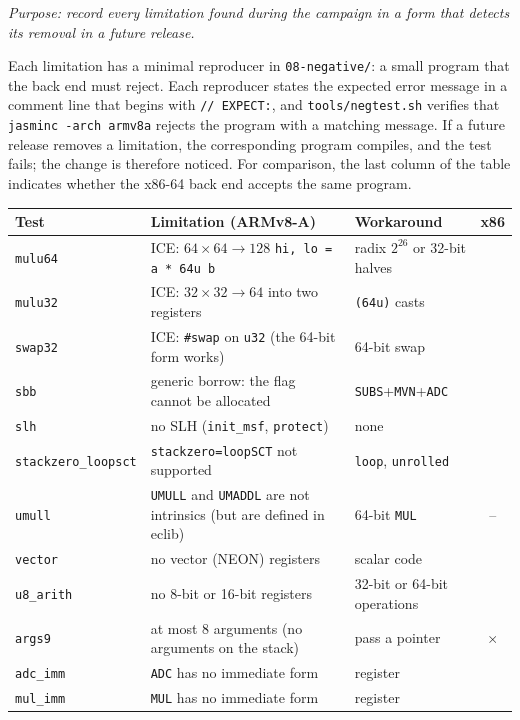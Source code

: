 \documentclass[11pt,a4paper]{article}
\newcommand{\yes}{\checkmark}
\newcommand{\no}{$\times$}
\newcommand{\ice}{ICE}
\newcommand{\file}[1]{\texttt{#1}}
\begin{document}
\emph{Purpose: record every limitation found during the campaign in a form
that detects its removal in a future release.}

Each limitation has a minimal reproducer in \file{08-negative/}: a small
program that the back end must reject. Each reproducer states the expected
error message in a comment line that begins with \texttt{// EXPECT:}, and
\file{tools/negtest.sh} verifies that \texttt{jasminc -arch armv8a} rejects
the program with a matching message. If a future release removes a
limitation, the corresponding program compiles, and the test fails; the
change is therefore noticed. For comparison, the last column of the table
indicates whether the x86-64 back end accepts the same program.

\begin{longtable}{@{}p{2.9cm}p{8.1cm}p{2.4cm}c@{}}
\toprule
\textbf{Test} & \textbf{Limitation (ARMv8-A)} & \textbf{Workaround} & \textbf{x86} \\
\midrule
\endhead
\texttt{mulu64} & \ice: $64\times64\to128$ \texttt{hi, lo = a * 64u b} & radix $2^{26}$ or 32-bit halves & \yes \\
\texttt{mulu32} & \ice: $32\times32\to64$ into two registers & \texttt{(64u)} casts & \yes \\
\texttt{swap32} & \ice: \texttt{\#swap} on \texttt{u32} (the 64-bit form works) & 64-bit swap & \yes \\
\texttt{sbb} & generic borrow: the flag cannot be allocated & \texttt{SUBS}+\texttt{MVN}+\texttt{ADC} & \yes \\
\texttt{slh} & no SLH (\texttt{init\_msf}, \texttt{protect}) & none & \yes \\
\texttt{stackzero\_\-loopsct} & \texttt{stackzero=loopSCT} not supported & \texttt{loop}, \texttt{unrolled} & \yes \\
\texttt{umull} & \texttt{UMULL} and \texttt{UMADDL} are not intrinsics (but are defined in eclib) & 64-bit \texttt{MUL} & -- \\
\texttt{vector} & no vector (NEON) registers & scalar code & \yes \\
\texttt{u8\_arith} & no 8-bit or 16-bit registers & 32-bit or 64-bit operations & \yes \\
\texttt{args9} & at most 8 arguments (no arguments on the stack) & pass a pointer & \no \\
\texttt{adc\_imm} & \texttt{ADC} has no immediate form & register & \yes \\
\texttt{mul\_imm} & \texttt{MUL} has no immediate form & register & \yes \\

\end{longtable}
\end{document}

